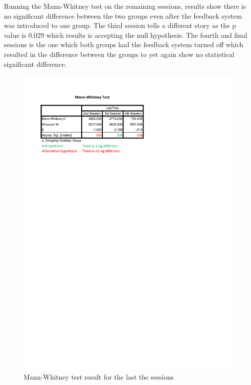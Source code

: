 Running the Mann-Whitney test on the remaining sessions, results show there is no significant difference between the two groups even after the feedback system was introduced to one group. The third session tells a different story as the p value is 0.029 which results is accepting the null hypothesis. The fourth and final sessions is the one which both groups had the feedback system turned off which resulted in the difference between the groups to yet again show no statistical significant difference.

\begin{figure}[!htb]
	\centering
	\includegraphics[width=\textwidth]{charts/Mann-Whitney-Sessions.pdf}
	\caption[Mann-Whitney Accross Sessions]{Mann-Whitney test result for the last the sessions}
	\label{fig:chart-Mann-Whitney-Sessions}
\end{figure}

